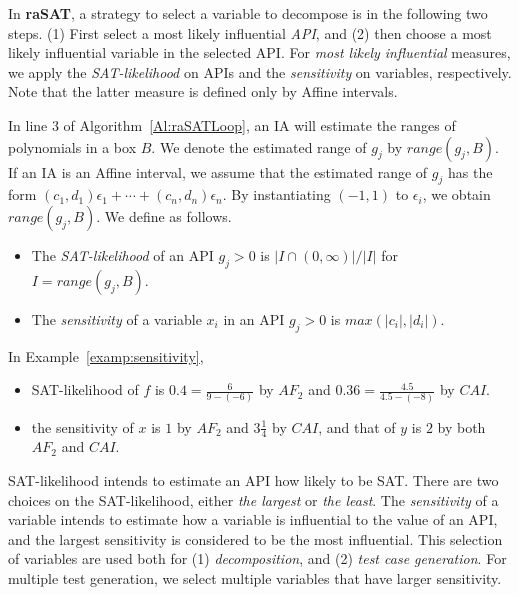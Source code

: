 \documentclass[runningheads,a4paper,oribibl]{llncs}
\begin{document}
In {\bf raSAT}, a strategy to select a variable to decompose is in the following two steps. 
(1) First select a most likely influential {\em API}, and
(2) then choose a most likely influential variable in the selected API. 
For {\em most likely influential} measures, we apply the {\em SAT-likelihood} on APIs and
the {\em sensitivity} on variables, respectively. Note that the latter measure is defined
only by Affine intervals. 

\sloppy

In line 3 of Algorithm~\ref{Al:raSATLoop}, an IA will estimate the ranges of polynomials in a box $B$.
We denote the estimated range of $g_j$ by $range(g_j, B)$. 
If an IA is an Affine interval,
we assume that the estimated range of $g_j$ has the form
${(c_1,d_1)\epsilon_1 + \cdots + (c_n,d_n)\epsilon_n}$.
By instantiating $(-1,1)$ to $\epsilon_i$, we obtain $range(g_j, B)$. 
We define as follows. 
\begin{itemize} 
\item The {\em SAT-likelihood} of an API $g_j > 0$ is $| I \cap (0,\infty) | / |I|$
  for  $I = range(g_j, B)$. 
\item The {\em sensitivity} of a variable $x_i$ in an API $g_j > 0$ is $max(|c_i|, |d_i|)$. 
\end{itemize} 

\begin{example} \label{examp:SATlikelihood}
In Example~\ref{examp:sensitivity}, 
\begin{itemize}
\item SAT-likelihood of $f$ is $0.4= \frac{6}{9-(-6)}$ by $AF_2$ 
and $0.36 = \frac{4.5}{4.5-(-8)}$ by $CAI$. 
\item the sensitivity of $x$ is $1$ by $AF_2$ and $3\frac{1}{4}$ by $CAI$,
  and that of $y$ is $2$ by both $AF_2$ and $CAI$. 
\end{itemize}
\end{example}


SAT-likelihood intends to estimate an API how likely to be SAT. 
There are two choices on the SAT-likelihood, either {\em the largest} or {\em the least}. 
The {\em sensitivity} of a variable intends to estimate how a variable is influential
to the value of an API, and the largest sensitivity is considered to be the most influential. 
This selection of variables are used both for (1) {\em decomposition}, and 
(2) {\em test case generation}. 
For multiple test generation, we select multiple variables that have larger sensitivity. 
\end{document}
